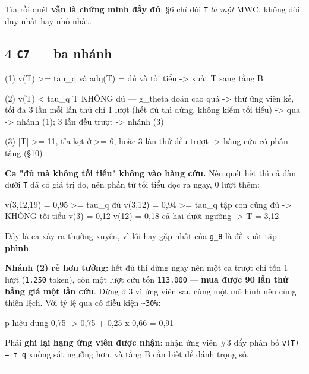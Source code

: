 \documentclass[11pt,a4paper]{article}
\begin{document}
Tỉa rồi quét \textbf{vẫn là chứng minh đầy đủ}: \S{}6 chỉ đòi \texttt{T} \emph{là một} MWC, không đòi duy nhất hay
nhỏ nhất.

\subsection{4 \texttt{C7} — ba nhánh}

\begin{dia}
(1) v(T) >= tau_q  và  adq(T) = đủ  và  tối tiểu
        ->  xuất T sang tầng B

(2) v(T) < tau_q                       T KHÔNG đủ — g_theta đoán cao quá
        ->  thử ứng viên kế, tối đa 3 lần
            mỗi lần thử chỉ 1 lượt (hết đủ thì dừng, không kiểm tối tiểu)
        ->  qua -> nhánh (1);   3 lần đều trượt -> nhánh (3)

(3) |T| >= 11,  tỉa kẹt ở >= 6,  hoặc 3 lần thử đều trượt
        ->  hàng cứu có phân tầng (§10)
\end{dia}

\textbf{Ca "đủ mà không tối tiểu" không vào hàng cứu.} Nếu quét hết thì cả dàn dưới \texttt{T} đã có giá
trị đo, nên phần tử tối tiểu đọc ra ngay, 0 lượt thêm:

\begin{dia}
v({3,12,19}) = 0,95 >= tau_q        đủ
v({3,12})    = 0,94 >= tau_q        tập con cũng đủ  ->  KHÔNG tối tiểu
v({3}) = 0,12   v({12}) = 0,18   cả hai dưới ngưỡng
->  T = {3,12}
\end{dia}

Đây là ca xảy ra thường xuyên, vì lỗi hay gặp nhất của \texttt{g\_θ} là đề xuất tập \textbf{phình}.

\textbf{Nhánh (2) rẻ hơn tưởng:} hết đủ thì dừng ngay nên một ca trượt chỉ tốn 1 lượt (\texttt{1.250}
token), còn một lượt cứu tốn \texttt{113.000} — \textbf{mua được 90 lần thử bằng giá một lần cứu}. Dừng ở
3 vì ứng viên sau cùng một mô hình nên cùng thiên lệch. Với tỷ lệ qua có điều kiện \texttt{\textasciitilde{}30\%}:

\begin{dia}
p hiệu dụng   0,75  ->  0,75 + 0,25 x 0,66  =  0,91
\end{dia}

Phải \textbf{ghi lại hạng ứng viên được nhận}: nhận ứng viên \#3 đẩy phân bố \texttt{v(T) − τ\_q} xuống sát
ngưỡng hơn, và tầng B cần biết để đánh trọng số.

\vspace{0.3em}\hrule\vspace{0.6em}
\end{document}

